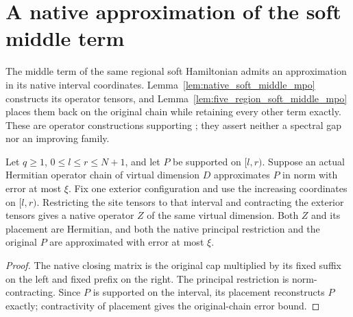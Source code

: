 \section{A native approximation of the soft middle term}
\label{sec:soft_generated_middle}

The middle term of the same regional soft Hamiltonian admits an approximation
in its native interval coordinates. Lemma~\ref{lem:native_soft_middle_mpo}
constructs its operator tensors, and
Lemma~\ref{lem:five_region_soft_middle_mpo} places them back on the original
chain while retaining every other term exactly. These are operator
constructions supporting \cite[Proposition~5.7 and Theorem~5.8]{Arad2016RigorousRG};
they assert neither a spectral gap nor an improving family.

\begin{lemma}
    \label{lem:native_supported_mpo_restriction}
    \leanok
    Let $q\ge1$, $0\le l\le r\le N+1$, and let $P$ be supported on
    $[l,r)$. Suppose an actual Hermitian operator chain of virtual
    dimension $D$ approximates $P$ in norm with error at most $\xi$.
    Fix one exterior configuration and use the increasing coordinates
    on $[l,r)$. Restricting the site tensors to that interval and
    contracting the exterior tensors gives a native operator $Z$ of
    the same virtual dimension. Both $Z$ and its placement are Hermitian,
    and both the native principal restriction and the original $P$ are
    approximated with error at most $\xi$.
\end{lemma}
\begin{proof}\leanok
    The native closing matrix is the original cap multiplied by its
    fixed suffix on the left and fixed prefix on the right.
    The principal restriction is norm-contracting. Since $P$ is supported
    on the interval, its placement reconstructs $P$ exactly; contractivity
    of placement gives the original-chain error bound.
\end{proof}

